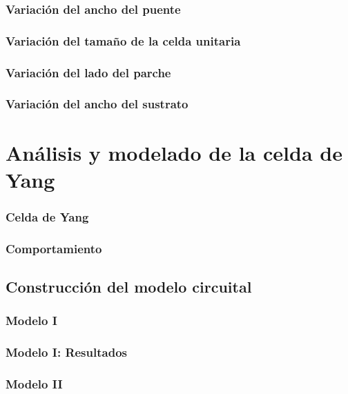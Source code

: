 \documentclass{beamer}
\begin{document}
	 	\begin{frame} %
	 	\frametitle{Variación del ancho del puente}
 		\end{frame}
 	
	 	\begin{frame} %
	 	\frametitle{Variación del tamaño de la celda unitaria}
	 	\end{frame}
 	
	 	\begin{frame} %
	 	\frametitle{Variación del lado del parche}
	 	\end{frame}
 	
	 	\begin{frame} %
	 	\frametitle{Variación del ancho del sustrato}
	 	\end{frame}
 	
\section{Análisis y modelado de la celda de Yang}
		
		\begin{frame} %
		\frametitle{Celda de Yang}
		\end{frame}
	
		\begin{frame} %
		\frametitle{Comportamiento}
		\end{frame}
	
	\subsection{Construcción del modelo circuital}
		\begin{frame} %
		\frametitle{Modelo I}
		\end{frame}
	
		\begin{frame} %
		\frametitle{Modelo I: Resultados}
		\end{frame}
	
		\begin{frame} %
		\frametitle{Modelo II}
		\end{frame}
\end{document}

